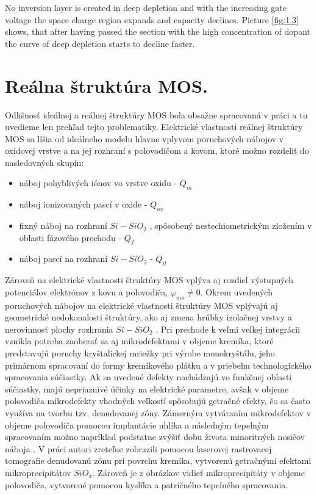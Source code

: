 \iffalse
\par V stave hlbokého ochudobnenia sa nevytvára inverzná vrstva a so
zvyšovaním napätia hradla sa oblasť priestorového náboja naďalej
rozpína a kapacita klesá. Z obrázku \ref{fig:1.3} je vidieť, že po
prekonaní oblasti s vysokou koncentráciou prímesí krivka hlbokého
ochudobnenia začína klesať rýchlejšie.
\fi
\par No inversion layer is created in deep depletion and with the
increasing gate voltage the space charge region expands and capacity
declines. Picture \ref{fig:1.3} shows, that after having passed the
section with the high concentration of dopant the curve of deep
depletion starts to decline faster.


\section{Reálna štruktúra MOS.}  Odlišnosť ideálnej a reálnej
štruktúry MOS bola obsažne spracovaná v práci \cite{1.12} a tu
uvedieme len prehľad tejto problematiky. Elektrické vlastnosti reálnej
štruktúry MOS sa líšia od ideálneho modelu hlavne vplyvom poruchových
nábojov v oxidovej vrstve a na jej rozhraní s polovodičom a kovom,
ktoré možno rozdeliť do nasledovných skupín:

\begin{itemize}
\item náboj pohyblivých iónov vo vrstve oxidu - $Q_{m}$
\item náboj ionizovaných pascí v oxide - $Q_{ox}$
\item fixný náboj na rozhraní $Si-SiO_2$ , spôsobený nestechiometrickým
  zložením v oblasti fázového prechodu - $Q_f$
\item náboj pascí na rozhraní $Si-SiO_2$  - $Q_{it}$
\end{itemize}

\par Zároveň na elektrické vlastnosti štruktúry MOS vplýva aj rozdiel
výstupných potenciálov elektrónov z kovu a polovodiča,
$\varphi_{ms}\neq{0}$.  Okrem uvedených poruchových nábojov na
elektrické vlastnosti štruktúry MOS vplývajú aj geometrické
nedokonalosti štruktúry, ako aj zmena hrúbky izolačnej vrstvy a
nerovinnosť plochy rozhrania $Si-SiO_2$ . Pri prechode k veľmi veľkej
integrácii vznikla potreba zaoberať sa aj mikrodefektami v objeme
kremíka, ktoré predstavujú poruchy kryštalickej mriežky pri výrobe
monokryštálu, jeho primárnom spracovaní do formy kremíkového plátku a
v priebehu technologického spracovania súčiastky. Ak sa uvedené
defekty nachádzajú vo funkčnej oblasti súčiastky, majú nepriaznivé
účinky na elektrické parametre, avšak v objeme polovodiča mikrodefekty
vhodných veľkostí spôsobujú getračné efekty, čo sa často využíva na
tvorbu tzv. denudovanej zóny.  Zámerným vytváraním mikrodefektov v
objeme polovodiča pomocou implantácie uhlíka a následným tepelným
spracovaním možno napríklad podstatne zvýšiť dobu života minoritných
nosičov náboja \cite{1.13}. V práci \cite{1.14} autori zreteľne
zobrazili pomocou laserovej rastrovacej tomografie denudovanú zónu pri
povrchu kremíka, vytvorenú getračnými efektami mikroprecipitátov
$SiO_x$. Zároveň je z obrázkov vidieť mikroprecipitáty v objeme
polovodiča, vytvorené pomocou kyslíka a patričného tepelného
spracovania.

